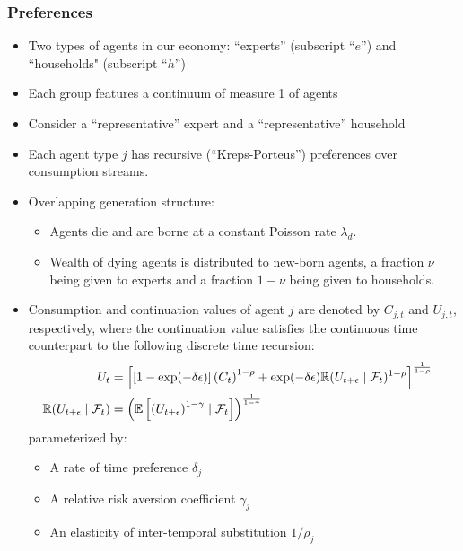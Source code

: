 \documentclass[12pt]{article}
\newcommand{\newbornRateSymbol}{$\nu$\xspace}
\newcommand{\deathrateSymbol}{$\lambda_d$\xspace}
\begin{document}
\subsubsection{Preferences}

\begin{itemize}
 \item Two types of agents in our economy: ``experts'' (subscript ``$e$'') and ``households" (subscript ``$h$'')
 \item Each group features a continuum of measure 1 of agents
 \item Consider a ``representative'' expert and a ``representative'' household
 \item Each agent type $j$ has recursive (``Kreps-Porteus'') preferences over consumption streams.  
 \item Overlapping generation structure: 
 \begin{itemize}
  \item Agents die and are borne at a constant Poisson rate \deathrateSymbol.
  \item Wealth of dying agents is distributed to new-born agents, a fraction \newbornRateSymbol being given to experts and a fraction $1-\nu$ being given to households. 
 \end{itemize}
  \item Consumption and continuation values of agent $j$ are denoted by $C_{j,t}$ and $U_{j,t}$, respectively, where the continuation value satisfies the continuous time counterpart to the following discrete time recursion:
\begin{align} \label{discrete_recursion}
U_t &= \left[ \left[ 1 - \exp( - \delta \epsilon ) \right]\left(C_t\right)^{1 - \rho} + \exp( - \delta \epsilon) {\mathbb R}(U_{t+\epsilon} \mid {\mathcal F}_t  )^{1 - \rho} \right]^{\frac 1 {1 - \rho}} \cr
 {\mathbb R}(U_{t+\epsilon} \mid {\mathcal F}_t ) & = \left(  \mathbb{E}  \left[ \left(U_{t+\epsilon} \right)^{1-\gamma} \mid {\mathcal F}_t \right]\right)^{\frac 1 {1-\gamma}}
\end{align}
 parameterized by: 
 \begin{itemize}
  \item A rate of time preference $\delta_j$
  \item A relative risk aversion coefficient $\gamma_j$
  \item An elasticity of inter-temporal substitution $1/\rho_j$
 \end{itemize}
\end{itemize}
\end{document}
